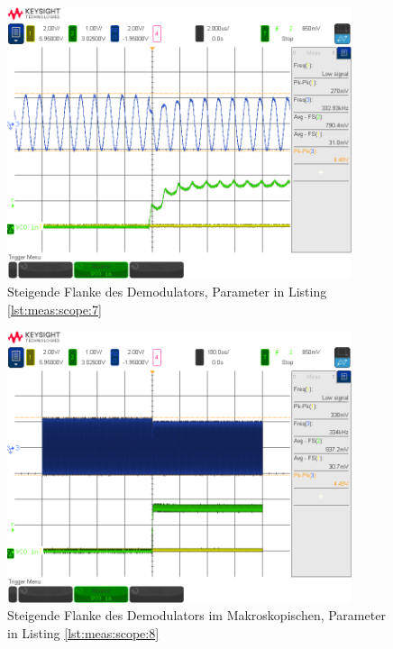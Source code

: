 \vspace*{7em}
\begin{figure}[h!tb]
    \centering
    \includegraphics[width=0.9\textwidth, trim=0mm 21mm 0mm 11mm, clip]{images/scopeShots/scope_7b.png}
    \caption{Steigende Flanke des Demodulators, Parameter in Listing \ref{lst:meas:scope:7}}
    \label{fig:meas:scope:7}
\end{figure}

\begin{figure}[h!tb]
    \centering
    \includegraphics[width=0.9\textwidth, trim=0mm 21mm 0mm 11mm, clip]{images/scopeShots/scope_8b.png}
    \caption{Steigende Flanke des Demodulators im Makroskopischen, Parameter in Listing \ref{lst:meas:scope:8}}
    \label{fig:meas:scope:8}
\end{figure}

